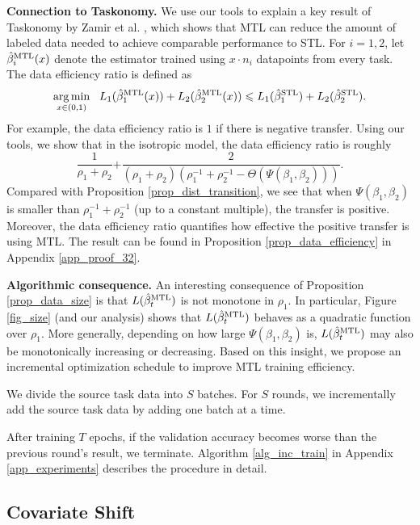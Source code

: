 \textbf{Connection to Taskonomy.} We use our tools to explain a key result of Taskonomy by Zamir et al. \cite{ZSSGM18}, which shows that MTL can reduce the amount of labeled data needed to achieve comparable performance to STL.
For $i = 1, 2$, let $\hat{\beta}_i^{\text{MTL}}(x)$ denote the estimator trained using $x \cdot n_i$ datapoints from every task. The data efficiency ratio is defined as
{\small\[ \operatorname*{arg\,min}_{x\in(0, 1)} ~~
		L_1(\hat{\beta}_1^{\text{MTL}}(x)) + L_2(\hat{\beta}_2^{\text{MTL}}(x))
		\leqslant L_1(\hat{\beta}_1^{\text{STL}}) + L_2(\hat{\beta}_2^{\text{STL}}). \]}
For example, the data efficiency ratio is $1$ if there is negative transfer.
Using our tools, we show that in the isotropic model, the data efficiency ratio is
roughly
{\small\[ \frac{1}{\rho_1 + \rho_2} {+ \frac{2}{(\rho_1 +\rho_2)(\rho_1^{-1} + \rho_2^{-1} - \Theta(\Psi(\beta_1, \beta_2)))}}. \]}%
Compared with Proposition \ref{prop_dist_transition}, we see that when $\Psi(\beta_1, \beta_2)$ is smaller than $\rho_1^{-1} + \rho_2^{-1}$ (up to a constant multiple), the transfer is positive.
Moreover, the data efficiency ratio quantifies how effective the positive transfer is using MTL.
The result can be found in Proposition \ref{prop_data_efficiency} in Appendix \ref{app_proof_32}.

\textbf{Algorithmic consequence.} An interesting consequence of Proposition \ref{prop_data_size} is that $L(\hat{\beta}_t^{\text{MTL}})$ is not monotone in $\rho_1$.
In particular, Figure \ref{fig_size} (and our analysis) shows that $L(\hat{\beta}_t^{\text{MTL}})$ behaves as a quadratic function over $\rho_1$.
More generally, depending on how large $\Psi(\beta_1, \beta_2)$ is, $L(\hat{\beta}_t^{\text{MTL}})$ may also be monotonically increasing or decreasing.
Based on this insight, we propose an incremental optimization schedule to improve MTL training efficiency.
\squishlist
	\item We divide the source task data into $S$ batches.
	For $S$ rounds, we incrementally add the source task data by adding one batch at a time.
	\item After training $T$ epochs, if the validation accuracy becomes worse than the previous round's result, we terminate.
	Algorithm \ref{alg_inc_train} in Appendix \ref{app_experiments} describes the procedure in detail.
\squishend


\subsection{Covariate Shift}\label{sec_covshift}

